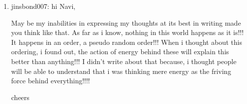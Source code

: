 \begin{enumerate}
\item{jinsbond007: }
hi Navi,

May be my inabilities in expressing my thoughts at its best in writing made you think like that. As far as i know, nothing in this world happens as it is!!! It happens in an order, a pseudo random order!!! When i thought about this ordering, i found out, the action of energy behind these will explain this better than anything!!! I didn’t write about that because, i thought people will be able to understand that i was thinking mere energy as the friving force behind everything!!!!

cheers


\end{enumerate}

\newpage
